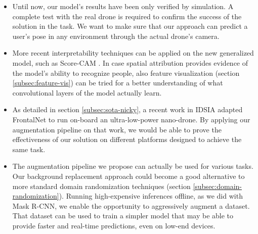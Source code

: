 \begin{itemize}

    \item Until now, our model's results have been only verified by simulation. A complete test with the real drone is required to confirm the success of the solution in the task. We want to make sure that our approach can predict a user's pose in any environment through the actual drone's camera.
    
    \item More recent interpretability techniques can be applied on the new generalized model, such as Score-CAM \cite{wang2020scorecam}. In case spatial attribution provides evidence of the model's ability to recognize people, also feature visualization (section \ref{subsec:feature-vis}) can be tried for a better understanding of what convolutional layers of the model actually learn.
    
    \item As detailed in section \ref{subsec:sota-nicky}, a recent work in IDSIA \cite{zimmerman2020thesis} adapted FrontalNet to run on-board an ultra-low-power nano-drone. By applying our augmentation pipeline on that work, we would be able to prove the effectiveness of our solution on different platforms designed to achieve the same task.
    
    \item The augmentation pipeline we propose can actually be used for various tasks. Our background replacement approach could become a good alternative to more standard domain randomization techniques (section \ref{subsec:domain-randomization}). Running high-expensive inferences offline, as we did with Mask R-CNN, we enable the opportunity to aggressively augment a dataset. That dataset can be used to train a simpler model that may be able to provide faster and real-time predictions, even on low-end devices.
    
\end{itemize}
